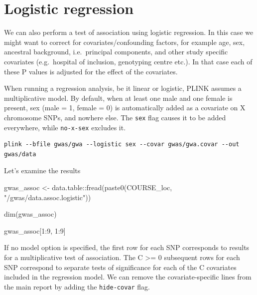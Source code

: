 \documentclass[
]{book}
\newenvironment{Shaded}{\begin{snugshade}}{\end{snugshade}}
\newcommand{\DecValTok}[1]{\textcolor[rgb]{0.00,0.00,0.81}{#1}}
\newcommand{\FunctionTok}[1]{\textcolor[rgb]{0.00,0.00,0.00}{#1}}
\newcommand{\NormalTok}[1]{#1}
\newcommand{\OtherTok}[1]{\textcolor[rgb]{0.56,0.35,0.01}{#1}}
\newcommand{\SpecialCharTok}[1]{\textcolor[rgb]{0.00,0.00,0.00}{#1}}
\newcommand{\StringTok}[1]{\textcolor[rgb]{0.31,0.60,0.02}{#1}}
\begin{document}
\hypertarget{logistic-regression}{%
\section{Logistic regression}\label{logistic-regression}}

We can also perform a test of association using logistic regression. In this case we might want to correct for covariates/confounding factors, for example age, sex, ancestral background, i.e.~principal components, and other study specific covariates (e.g.~hospital of inclusion, genotyping centre etc.). In that case each of these P values is adjusted for the effect of the covariates.

When running a regression analysis, be it linear or logistic, PLINK assumes a multiplicative model. By default, when at least one male and one female is present, sex (male = 1, female = 0) is automatically added as a covariate on X chromosome SNPs, and nowhere else. The \texttt{sex} flag causes it to be added everywhere, while \texttt{no-x-sex} excludes it.

\begin{verbatim}
plink --bfile gwas/gwa --logistic sex --covar gwas/gwa.covar --out gwas/data
\end{verbatim}

Let's examine the results

\begin{Shaded}
\begin{Highlighting}[]
\NormalTok{gwas\_assoc }\OtherTok{\textless{}{-}}\NormalTok{ data.table}\SpecialCharTok{::}\FunctionTok{fread}\NormalTok{(}\FunctionTok{paste0}\NormalTok{(COURSE\_loc, }\StringTok{"/gwas/data.assoc.logistic"}\NormalTok{))}

\FunctionTok{dim}\NormalTok{(gwas\_assoc)}

\NormalTok{gwas\_assoc[}\DecValTok{1}\SpecialCharTok{:}\DecValTok{9}\NormalTok{, }\DecValTok{1}\SpecialCharTok{:}\DecValTok{9}\NormalTok{]}
\end{Highlighting}
\end{Shaded}

If no model option is specified, the first row for each SNP corresponds to results for a multiplicative test of association. The C \textgreater= 0 subsequent rows for each SNP correspond to separate tests of significance for each of the C covariates included in the regression model. We can remove the covariate-specific lines from the main report by adding the \texttt{hide-covar} flag.
\end{document}
